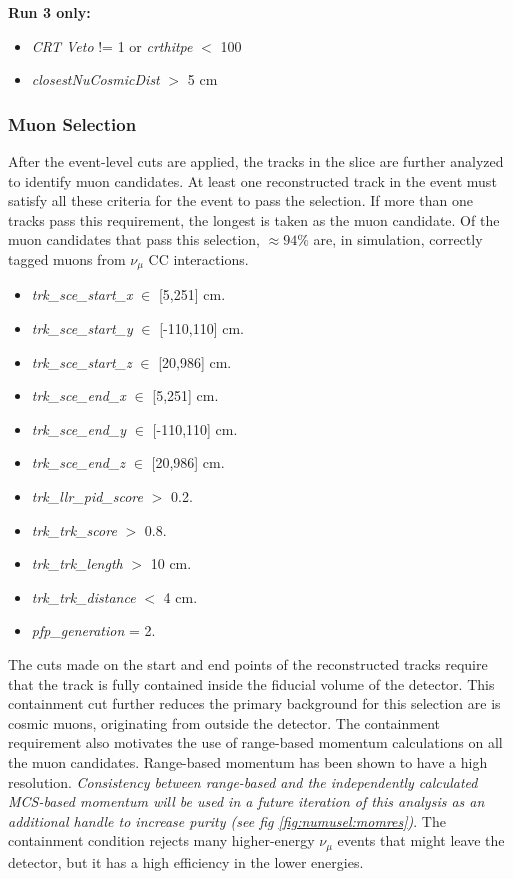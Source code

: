 \textbf{Run 3 only:}
\begin{itemize}
    \item \emph{CRT Veto} != 1 or \emph{crthitpe} $<$ 100
    \item \emph{closestNuCosmicDist} $>$ 5 cm
\end{itemize}

\subsubsection{Muon Selection}
\label{sssec:NuMUCCsel:constr:muonsel}

\par After the event-level cuts are applied, the tracks in the slice are further analyzed to identify muon candidates. At least one reconstructed track in the event must satisfy all these criteria for the event to pass the selection. If more than one tracks pass this requirement, the longest is taken as the muon candidate. Of the muon candidates that pass this selection, $\approx 94\%$ are, in simulation, correctly tagged muons from $\nu_{\mu}$ CC interactions.

\begin{itemize}
    \item \emph{trk\_sce\_start\_x} $\in$ [5,251] cm.
    \item \emph{trk\_sce\_start\_y} $\in$ [-110,110] cm.
    \item \emph{trk\_sce\_start\_z} $\in$ [20,986] cm.
    \item \emph{trk\_sce\_end\_x} $\in$ [5,251] cm.
    \item \emph{trk\_sce\_end\_y} $\in$ [-110,110] cm.
    \item \emph{trk\_sce\_end\_z} $\in$ [20,986] cm.
    \item \emph{trk\_llr\_pid\_score} $>$ 0.2.
    \item \emph{trk\_trk\_score} $>$ 0.8.
    \item \emph{trk\_trk\_length} $>$ 10 cm.
    \item \emph{trk\_trk\_distance} $<$ 4 cm.
    \item \emph{pfp\_generation} = 2.
\end{itemize}

\par \noindent The cuts made on the start and end points of the reconstructed tracks require that the track is fully contained inside the fiducial volume of the detector. This containment cut further reduces the primary background for this selection are is cosmic muons, originating from outside the detector. The containment requirement also motivates the use of range-based momentum calculations on all the muon candidates. Range-based momentum has been shown to have a high resolution. \emph{Consistency between range-based and the independently calculated MCS-based momentum will be used in a future iteration of this analysis as an additional handle to increase purity (see fig \ref{fig:numusel:momres})}. The containment condition rejects many higher-energy $\nu_{\mu}$ events that might leave the detector, but it has a high efficiency in the lower energies.

